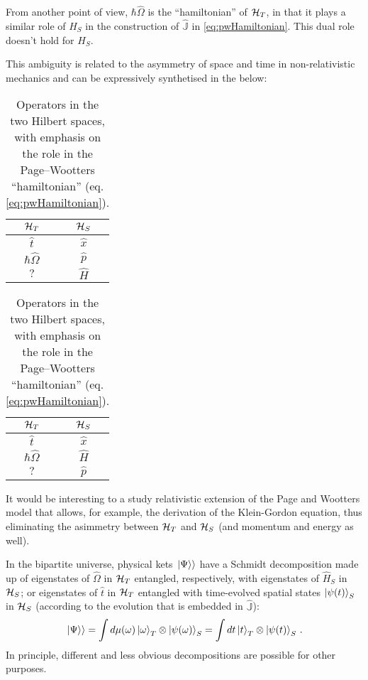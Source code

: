 From another point of view, $\hbar\hat{\Omega}$ is the ``hamiltonian'' of $\mathcal{H}_T$,
in that it plays a similar role of $H_S$ in the construction of
$\hat{\mathbb{J}}$ in \eqref{eq:pwHamiltonian}. This dual role doesn't hold
for $H_S$. 

This ambiguity is related to the asymmetry of space and time in non-relativistic
mechanics and can be expressively synthetised in the below:
{
  \begin{table}[h!]
    \parbox{.45\linewidth}{
      \centering
      \begin{tabular}{c|c}
        $\mathcal{H}_T$        & $\mathcal{H}_S$  \\
        \hline
        \hline
        $\hat{t}$           & $\hat{x}$     \\
        \hline
        $\hbar\hat{\Omega}$ & $\hat{p}$     \\
        \hline
        $?$                 & $\hat{H}$
      \end{tabular}
      {\caption{
        Operators in the two Hilbert spaces,
        with emphasis on the algebraic relation
        to other operators in the same space.
      }\label{op_comparison_alg}}
    }
    \hfill
    \parbox{.45\linewidth}{
      \centering
      \begin{tabular}{c|c}
        $\mathcal{H}_T$        & $\mathcal{H}_S$  \\
        \hline
        \hline
        $\hat{t}$           & $\hat{x}$     \\
        \hline
        $\hbar\hat{\Omega}$ & $\hat{H}$     \\
        \hline
        $?$                 & $\hat{p}$
      \end{tabular}
      {\caption{
        Operators in the two Hilbert spaces,
        with emphasis on the role in the
        Page--Wootters ``hamiltonian'' (eq. \ref{eq:pwHamiltonian}).
      }\label{op_comparison_J}}
    }
  \end{table}
}

It would be interesting to a study relativistic extension of the
Page and Wootters model that allows, for example, the derivation of the Klein-Gordon
equation, thus eliminating the asimmetry between
$\mathcal{H}_T$ and $\mathcal{H}_S$ (and momentum and energy as well).

In the bipartite universe, physical kets $\left.\left| \Psi \right\rangle\right\rangle$ have a Schmidt decomposition
made up of
eigenstates of $\hat{\Omega}$ in $\mathcal{H}_T$
entangled, respectively, with
eigenstates of $\hat{H}_S$ in $\mathcal{H}_S$;
or eigenstates of $\hat{t}$ in $\mathcal{H}_T$
entangled with time-evolved spatial states $\ket{\psi(t)}_S$ in $\mathcal{H}_S$
(according to the evolution that is embedded in $\hat{\mathbb{J}}$):
\begin{equation}
  \left.\left| \Psi \right\rangle\right\rangle = \int d\mu(\omega) \ket{\omega}_{T}\otimes\ket{\psi(\omega)}_{S} = \int dt \ket{t}_{T} \otimes \ket{\psi(t)}_{S}\,\text{.} 
\end{equation}
In principle, different and less obvious decompositions are possible for other purposes.
